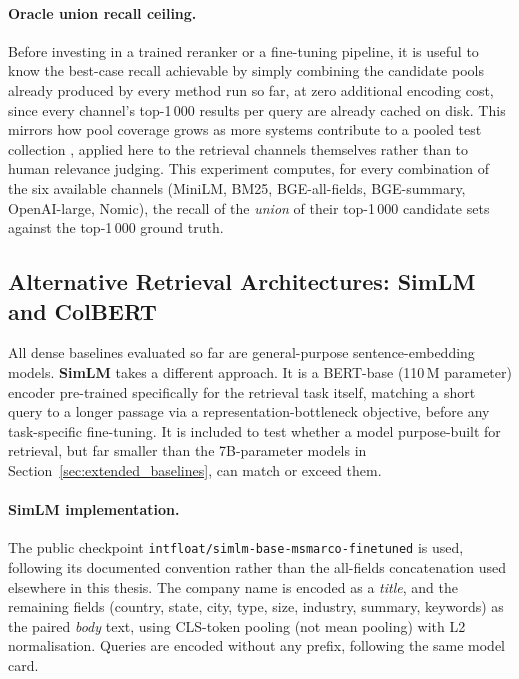 \documentclass[a4paper,oneside,bibliography=totoc]{scrbook}
\begin{document}
\paragraph{Oracle union recall ceiling.}
\label{sec:oracle_union}

Before investing in a trained reranker or a fine-tuning pipeline, it is useful to know the best-case recall achievable by simply combining the candidate pools already produced by every method run so far, at zero additional encoding cost, since every channel's top-1\,000 results per query are already cached on disk. This mirrors how pool coverage grows as more systems contribute to a pooled test collection \citep{zobel1998reliable}, applied here to the retrieval channels themselves rather than to human relevance judging. This experiment computes, for every combination of the six available channels (MiniLM, BM25, BGE-all-fields, BGE-summary, OpenAI-large, Nomic), the recall of the \emph{union} of their top-1\,000 candidate sets against the top-1\,000 ground truth.

\subsection{Alternative Retrieval Architectures: SimLM and ColBERT}
\label{sec:simlm}

All dense baselines evaluated so far are general-purpose sentence-embedding models. \textbf{SimLM} \citep{wang2022simlm} takes a different approach. It is a BERT-base (110\,M parameter) encoder pre-trained specifically for the retrieval task itself, matching a short query to a longer passage via a representation-bottleneck objective, before any task-specific fine-tuning. It is included to test whether a model purpose-built for retrieval, but far smaller than the 7B-parameter models in Section~\ref{sec:extended_baselines}, can match or exceed them.

\begin{sloppypar}
\paragraph{SimLM implementation.} The public checkpoint \texttt{intfloat/simlm-base-msmarco-finetuned} is used, following its documented convention rather than the all-fields concatenation used elsewhere in this thesis. The company name is encoded as a \emph{title}, and the remaining fields (country, state, city, type, size, industry, summary, keywords) as the paired \emph{body} text, using CLS-token pooling (not mean pooling) with L2 normalisation. Queries are encoded without any prefix, following the same model card.
\end{sloppypar}
\end{document}
